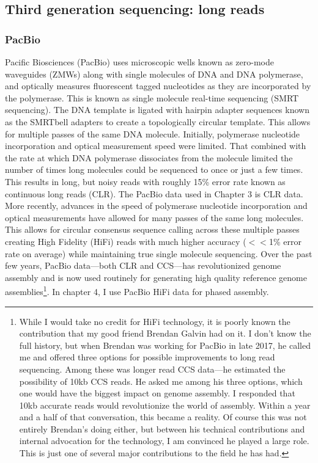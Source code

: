 \subsection{Third generation sequencing: long reads}\label{section:longreads}

\subsubsection{PacBio}

\par{
Pacific Biosciences (PacBio) uses microscopic wells known as zero-mode waveguides (ZMWs) along with single molecules of DNA and DNA polymerase, and optically measures fluorescent tagged nucleotides as they are incorporated by the polymerase. This is known as single molecule real-time sequencing (SMRT sequencing). The DNA template is ligated with hairpin adapter sequences known as the SMRTbell adapters to create a topologically circular template. This allows for multiple passes of the same DNA molecule. Initially, polymerase nucleotide incorporation and optical measurement speed were limited. That combined with the rate at which DNA polymerase dissociates from the molecule limited the number of times long molecules could be sequenced to once or just a few times. This results in long, but noisy reads with roughly 15\% error rate\cite{pacbio}\cite{blasr}\cite{clrerror} known as continuous long reads (CLR). The PacBio data used in Chapter 3 is CLR data. More recently, advances in the speed of polymerase nucleotide incorporation and optical measurements have allowed for many passes of the same long molecules. This allows for circular consensus sequence calling across these multiple passes creating High Fidelity (HiFi) reads with much higher accuracy ($<<$1\% error rate on average) while maintaining true single molecule sequencing\cite{HIFI}. Over the past few years, PacBio data---both CLR and CCS---has revolutionized genome assembly and is now used routinely for generating high quality reference genome assemblies\footnote{While I would take no credit for HiFi technology, it is poorly known the contribution that my good friend Brendan Galvin had on it. I don't know the full history, but when Brendan was working for PacBio in late 2017, he called me and offered three options for possible improvements to long read sequencing. Among these was longer read CCS data---he estimated the possibility of 10kb CCS reads. He asked me among his three options, which one would have the biggest impact on genome assembly. I responded that 10kb accurate reads would revolutionize the world of assembly. Within a year and a half of that conversation, this became a reality. Of course this was not entirely Brendan's doing either, but between his technical contributions and internal advocation for the technology, I am convinced he played a large role. This is just one of several major contributions to the field he has had.}. In chapter 4, I use PacBio HiFi data for phased assembly.
}

